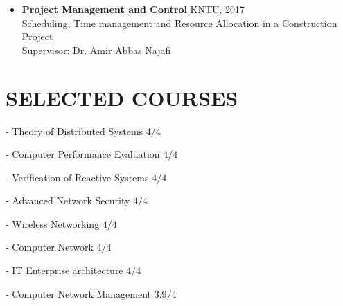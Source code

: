 \documentclass[11pt]{article}
\begin{document}
\begin{itemize}
	
	
	\item \textbf{Project Management and Control} \hfill KNTU, 2017\\
	Scheduling, Time management and Resource Allocation in a Construction Project\\
	Supervisor: Dr. Amir Abbas Najafi
	\href{https://scholar.google.com/citations?user=adOQSIEAAAAJ&hl=en&oi=ao}{\small \faExternalLink}
	
	
\end{itemize}




\section{SELECTED COURSES}
		\vspace{-5mm}
	     \setlength\itemsep{0em}
	     \begin{multicols}{2}
				- Theory of Distributed Systems  \hfill $4/4$ 
				
			    -  Computer Performance Evaluation \hfill $4/4$
			    
			    - Verification of Reactive Systems  \hfill  $4/4$
			     
				 - Advanced Network Security  \hfill $4/4$
				 
		         - Wireless Networking  \hfill $4/4$
		         
		         - Computer Network  \hfill $4/4$
		         
		          - IT Enterprise architecture  \hfill  $4/4$
		         
		         - Computer Network Management  \hfill $3.9/4$
		         

		         
		     \end{multicols}
\end{document}
